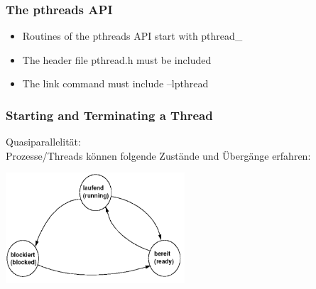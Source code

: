 \subsubsection{The pthreads API}
\begin{itemize}
\item Routines of the pthreads API start with pthread\_
\item The header file pthread.h must be included
\item The link command must include –lpthread
\end{itemize}
\subsubsection{Starting and Terminating a Thread}





Quasiparallelität:\\
Prozesse/Threads können folgende Zustände und Übergänge erfahren: 
\begin{center}
{\includegraphics[width=0.5\textwidth]{images/Concurrency/Prozesszustaende.png}}
\end{center}

